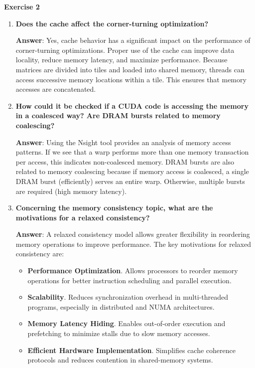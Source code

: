 \begin{flushleft}
    \textcolor{Green3}{ \textbf{Exercise 2}}
\end{flushleft}
\begin{enumerate}[label=\Alph*.]
    \item \textcolor{Green3}{\textbf{%
        Does the cache affect the corner-turning optimization?
    }}

    \textbf{Answer}: Yes, cache behavior has a significant impact on the performance of corner-turning optimizations. Proper use of the cache can improve data locality, reduce memory latency, and maximize performance. Because matrices are divided into tiles and loaded into shared memory, threads can access successive memory locations within a tile. This ensures that memory accesses are concatenated.

    \item \textcolor{Green3}{\textbf{%
        How could it be checked if a CUDA code is accessing the memory in a coalesced way? Are DRAM bursts related to memory coalescing?
    }}

    \textbf{Answer}: Using the Nsight tool provides an analysis of memory access patterns. If we see that a warp performs more than one memory transaction per access, this indicates non-coalesced memory. DRAM bursts are also related to memory coalescing because if memory access is coalesced, a single DRAM burst (efficiently) serves an entire warp. Otherwise, multiple bursts are required (high memory latency).

    \item \textcolor{Green3}{\textbf{%
        Concerning the memory consistency topic, what are the motivations for a relaxed consistency?
    }}

    \textbf{Answer}: A relaxed consistency model allows greater flexibility in reordering memory operations to improve performance. The key motivations for relaxed consistency are:
    \begin{itemize}
        \item \textbf{Performance Optimization}. Allows processors to reorder memory operations for better instruction scheduling and parallel execution.
        
        \item \textbf{Scalability}. Reduces synchronization overhead in multi-threaded programs, especially in distributed and NUMA architectures.
        
        \item \textbf{Memory Latency Hiding}. Enables out-of-order execution and prefetching to minimize stalls due to slow memory accesses.
        
        \item \textbf{Efficient Hardware Implementation}. Simplifies cache coherence protocols and reduces contention in shared-memory systems.
    \end{itemize}
\end{enumerate}


